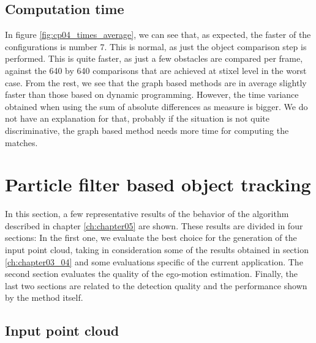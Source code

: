 \subsection{Computation time}\label{ch:chapter04_02_04}

In figure \ref{fig:cp04_times_average}, we can see that, as expected, the faster of the configurations is number 7. This is normal, as just the object comparison step is performed. This is quite faster, as just a few obstacles are compared per frame, against the 640 by 640 comparisons that are achieved at stixel level in the worst case. From the rest, we see that the graph based methods are in average slightly faster than those based on dynamic programming. However, the time variance obtained when using the sum of absolute differences as measure is bigger. We do not have an explanation for that, probably if the situation is not quite discriminative, the graph based method needs more time for computing the matches.

\FloatBarrier

\graphicspath{{./images/chapter05/bmps/}{./images/chapter05/vects/}{./images/chapter05/}}
\section{Particle filter based object tracking}\label{ch:chapter05_02}

In this section, a few representative results of the behavior of the algorithm described in chapter \ref{ch:chapter05} are shown. These results are divided in four sections: In the first one, we evaluate the best choice for the generation of the input point cloud, taking in consideration some of the results obtained in section \ref{ch:chapter03_04} and some evaluations specific of the current application. The second section evaluates the quality of the ego-motion estimation. Finally, the last two sections are related to the detection quality and the performance shown by the method itself.

\subsection{Input point cloud}\label{ch:chapter05_02_01}

